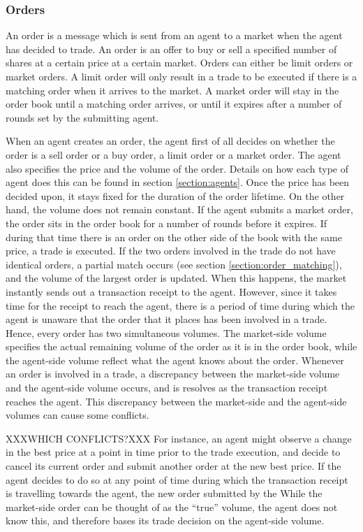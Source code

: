 \subsubsection{Orders}
An order is a message which is sent from an agent to a market when the agent has decided to trade. An order is an offer to buy or sell a specified number of shares at a certain price at a certain market. Orders can either be limit orders or market orders. A limit order will only result in a trade to be executed if there is a matching order when it arrives to the market. A market order will stay in the order book until a matching order arrives, or until it expires after a number of rounds set by the submitting agent. 

When an agent creates an order, the agent first of all decides on whether the order is a sell order or a buy order, a limit order or a market order. The agent also specifies the price and the volume of the order. Details on how each type of agent does this can be found in section \ref{section:agents}. Once the price has been decided upon, it stays fixed for the duration of the order lifetime. On the other hand, the volume does not remain constant. If the agent submits a market order, the order sits in the order book for a number of rounds before it expires. If during that time there is an order on the other side of the book with the same price, a trade is executed. If the two orders involved in the trade do not have identical orders, a partial match occurs (see section \ref{section:order_matching}), and the volume of the largest order is updated. When this happens, the market instantly sends out a transaction receipt to the agent. However, since it takes time for the receipt to reach the agent, there is a period of time during which the agent is unaware that the order that it places has been involved in a trade. Hence, every order has two simultaneous volumes. The market-side volume specifies the actual remaining volume of the order as it is in the order book, while the agent-side volume reflect what the agent knows about the order. Whenever an order is involved in a trade, a discrepancy between the market-side volume and the agent-side volume occurs, and is resolves as the transaction receipt reaches the agent. This discrepancy between the market-side and the agent-side volumes can cause some conflicts. 

XXXWHICH CONFLICTS?XXX For instance, an agent might observe a change in the best price at a point in time prior to the trade execution, and decide to cancel its current order and submit another order at the new best price. If the agent decides to do so at any point of time during which the transaction receipt is travelling towards the agent, the new order submitted by the  
While the market-side order can be thought of as the ``true'' volume, the agent does not know this, and therefore bases its trade decision on the agent-side volume.







